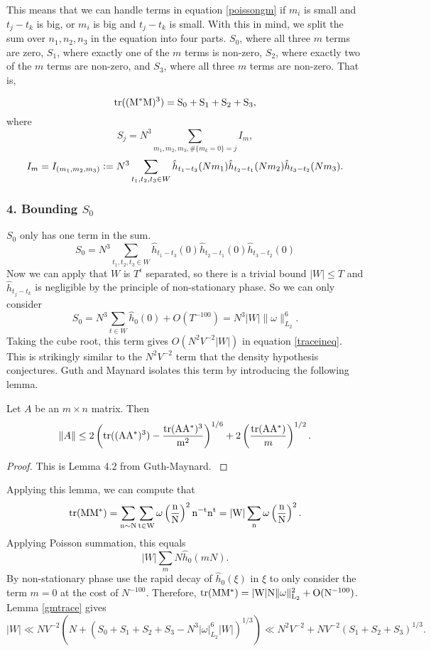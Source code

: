 This means that we can handle terms in equation \ref{poissongm} if $m_i$ is small and $t_j-t_k$ is big, or  $m_i$ is big and $t_j-t_k$ is small. With this in mind, we split the sum over $n_1,n_2,n_3$ in the equation into four parts. $S_0$, where all three $m$ terms are zero, $S_1$, where exactly one of the $m$ terms is non-zero, $S_2$, where exactly two of the $m$ terms are non-zero, and $S_3$, where all three $m$ terms are non-zero.
That is,

\[\rm{tr}((M^*M)^3)= S_0+S_1+S_2+S_3, \]
where \[
S_j = N^3\sum_{m_1,m_2,m_3, \#\{m_k=0\}=j} I_m,
\]
\[
I_m=I_{(m_1,m_2,m_3)}\mathrel{\mathop:}= N^3\sum_{t_1,t_2,t_3\in W}\hat{h}_{t_1-t_3}(Nm_1)\hat{h}_{t_2-t_1}(Nm_2)\hat{h}_{t_3-t_2}(Nm_3).
\]

\subsubsection*{4. Bounding $S_0$}
$S_0$ only has one term in the sum. \[
S_0 = N^3\sum_{t_1,t_2,t_3\in W} \hat{h}_{t_1-t_3}(0)\hat{h}_{t_2-t_1}(0)\hat{h}_{t_3-t_2}(0)
\]
Now we can apply that $W$ is $T^\epsilon$ separated, so there is a trivial bound $|W|\leq T$ and $\hat{h}_{t_j-t_k}$ is negligible by the principle of non-stationary phase. So we can only consider \[
S_0 = N^3\sum_{t\in W}\hat{h}_0(0) + O(T^{-100}) = N^3|W|\|\omega\|_{L_2}^6.
\]Taking the cube root, this term gives $O(N^2V^{-2}|W|)$ in equation \ref{traceineq}. This is strikingly similar to the $N^2V^{-2}$ term that the density hypothesis conjectures. Guth and Maynard isolates this term by introducing the following lemma.
\begin{lemma}\label{gmtrace}
    Let $A$ be an $m\times n$ matrix. Then 
    \[\|A\| \leq 2\left(\rm{tr}((AA^*)^3)-\frac{\rm{tr}(AA^*)^3}{m^2}\right)^{1/6}+2\left(\frac{\rm{tr}(AA^*)}{m}\right)^{1/2}.
    \]
\end{lemma}
\begin{proof}
    This is Lemma 4.2 from Guth-Maynard. \cite{}
\end{proof}
Applying this lemma, we can compute that \[
    \rm{tr}(MM^*) =\sum_{n\sim N} \sum_{t\in W} \omega\left(\frac{n}{N}\right)^2 n^{-t} n^{t}= |W|\sum_n \omega\left(\frac{n}{N}\right)^2.
\]
Applying Poisson summation, this equals \[
    |W|\sum_m N \hat{h}_0(mN).
\]
By non-stationary phase use the rapid decay of $\hat{h}_0(\xi)$ in $\xi$ to only consider the term $m=0$ at the cost of $N^{-100}$.
Therefore, $\rm{tr}(MM^*)=|W|N\|\omega\|_{L_2}^2+O(N^{-100})$.
Lemma \ref{gmtrace} gives \[
|W|\ll NV^{-2}(N+(S_0+S_1+S_2+S_3-N^3|\omega|_{L_2}^6|W|)^{1/3}) \ll N^2V^{-2}+  NV^{-2}(S_1+S_2+S_3)^{1/3}. 
\]


